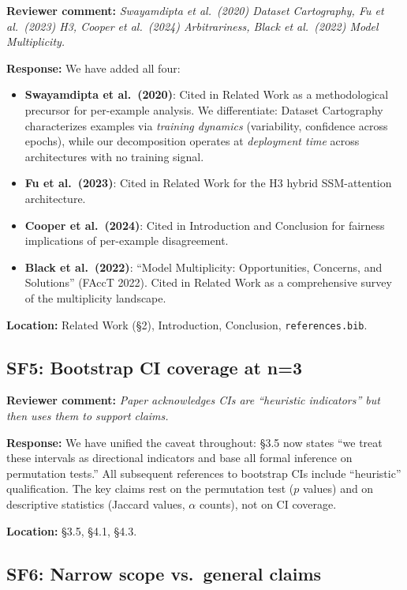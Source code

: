 \documentclass[11pt]{article}
\newcommand{\reviewer}[1]{\textcolor{reviewercolor}{\textbf{Reviewer comment:} \textit{#1}}}
\newcommand{\response}[1]{\textcolor{responsecolor}{\textbf{Response:} #1}}
\newcommand{\location}[1]{\textbf{Location:} #1}
\begin{document}
\reviewer{Swayamdipta et al.\ (2020) Dataset Cartography, Fu et al.\ (2023) H3, Cooper et al.\ (2024) Arbitrariness, Black et al.\ (2022) Model Multiplicity.}

\response{We have added all four:}
\begin{itemize}[leftmargin=2em]
\item \textbf{Swayamdipta et al.\ (2020)}: Cited in Related Work as a methodological precursor for per-example analysis. We differentiate: Dataset Cartography characterizes examples via \emph{training dynamics} (variability, confidence across epochs), while our decomposition operates at \emph{deployment time} across architectures with no training signal.
\item \textbf{Fu et al.\ (2023)}: Cited in Related Work for the H3 hybrid SSM-attention architecture.
\item \textbf{Cooper et al.\ (2024)}: Cited in Introduction and Conclusion for fairness implications of per-example disagreement.
\item \textbf{Black et al.\ (2022)}: ``Model Multiplicity: Opportunities, Concerns, and Solutions'' (FAccT 2022). Cited in Related Work as a comprehensive survey of the multiplicity landscape.
\end{itemize}

\location{Related Work (\S2), Introduction, Conclusion, \texttt{references.bib}.}

\subsection*{SF5: Bootstrap CI coverage at n=3}

\reviewer{Paper acknowledges CIs are ``heuristic indicators'' but then uses them to support claims.}

\response{We have unified the caveat throughout: \S3.5 now states ``we treat these intervals as directional indicators and base all formal inference on permutation tests.'' All subsequent references to bootstrap CIs include ``heuristic'' qualification. The key claims rest on the permutation test ($p$ values) and on descriptive statistics (Jaccard values, $\alpha$ counts), not on CI coverage.}

\location{\S3.5, \S4.1, \S4.3.}

\subsection*{SF6: Narrow scope vs.\ general claims}
\end{document}
